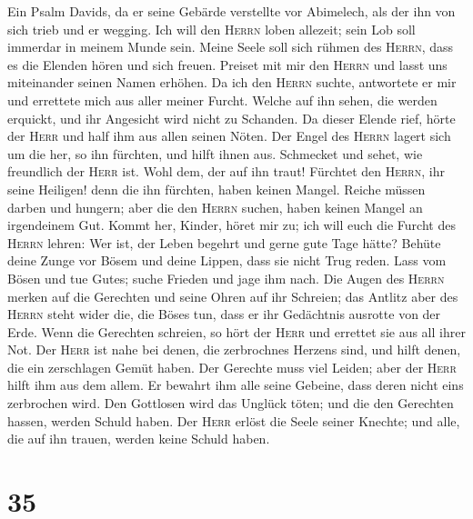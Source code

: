  Ein Psalm Davids, da er seine Gebärde verstellte vor
Abimelech, als der ihn von sich trieb und er wegging.  Ich
will den \textsc{Herrn} loben allezeit; sein Lob soll immerdar in meinem
Munde sein.  Meine Seele soll sich rühmen des
\textsc{Herrn}, dass es die Elenden hören und sich freuen.
 Preiset mit mir den \textsc{Herrn} und lasst uns
miteinander seinen Namen erhöhen.  Da ich den
\textsc{Herrn} suchte, antwortete er mir und errettete mich aus aller
meiner Furcht.  Welche auf ihn sehen, die werden erquickt,
und ihr Angesicht wird nicht zu Schanden.  Da dieser
Elende rief, hörte der \textsc{Herr} und half ihm aus allen seinen
Nöten.  Der Engel des \textsc{Herrn} lagert sich um die
her, so ihn fürchten, und hilft ihnen aus.  Schmecket und
sehet, wie freundlich der \textsc{Herr} ist. Wohl dem, der auf ihn
traut!  Fürchtet den \textsc{Herrn}, ihr seine Heiligen!
denn die ihn fürchten, haben keinen Mangel.  Reiche
müssen darben und hungern; aber die den \textsc{Herrn} suchen, haben
keinen Mangel an irgendeinem Gut.  Kommt her, Kinder,
höret mir zu; ich will euch die Furcht des \textsc{Herrn} lehren:
 Wer ist, der Leben begehrt und gerne gute Tage hätte?
 Behüte deine Zunge vor Bösem und deine Lippen, dass sie
nicht Trug reden.  Lass vom Bösen und tue Gutes; suche
Frieden und jage ihm nach.  Die Augen des \textsc{Herrn}
merken auf die Gerechten und seine Ohren auf ihr Schreien;
 das Antlitz aber des \textsc{Herrn} steht wider die, die
Böses tun, dass er ihr Gedächtnis ausrotte von der Erde. 
Wenn die Gerechten schreien, so hört der \textsc{Herr} und errettet sie
aus all ihrer Not.  Der \textsc{Herr} ist nahe bei denen,
die zerbrochnes Herzens sind, und hilft denen, die ein zerschlagen Gemüt
haben.  Der Gerechte muss viel Leiden; aber der
\textsc{Herr} hilft ihm aus dem allem.  Er bewahrt ihm
alle seine Gebeine, dass deren nicht eins zerbrochen wird.
 Den Gottlosen wird das Unglück töten; und die den
Gerechten hassen, werden Schuld haben.  Der \textsc{Herr}
erlöst die Seele seiner Knechte; und alle, die auf ihn trauen, werden
keine Schuld haben.

\hypertarget{section-34}{%
\section{35}\label{section-34}}

